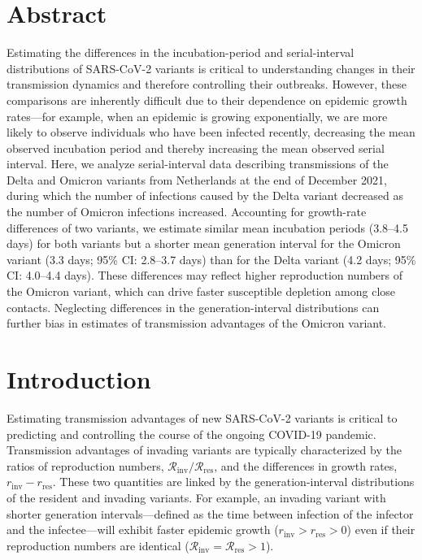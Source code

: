 \documentclass[12pt]{article}
\date{\today}
\newcommand{\Rx}[1]{\ensuremath{{\mathcal R}_{#1}}\xspace}
\newcommand{\Rres}{\Rx{\mathrm{res}}}
\newcommand{\Rinv}{\Rx{\mathrm{inv}}}
\newcommand{\rx}[1]{\ensuremath{{r}_{#1}}\xspace}
\newcommand{\rres}{\rx{\mathrm{res}}}
\newcommand{\rinv}{\rx{\mathrm{inv}}}
\begin{document}
\begin{flushleft}{
	\Large
	\textbf{}
}
\bigskip

\section*{Abstract}

Estimating the differences in the incubation-period and serial-interval distributions of SARS-CoV-2 variants is critical to understanding changes in their transmission dynamics and therefore controlling their outbreaks.
However, these comparisons are inherently difficult due to their dependence on epidemic growth rates---for example, when an epidemic is growing exponentially, we are more likely to observe individuals who have been infected recently, decreasing the mean observed incubation period and thereby increasing the mean observed serial interval.
Here, we analyze serial-interval data describing transmissions of the Delta and Omicron variants from Netherlands at the end of December 2021, during which the number of infections caused by the Delta variant decreased as the number of Omicron infections increased. 
Accounting for growth-rate differences of two variants, we estimate similar mean incubation periods (3.8--4.5 days) for both variants but a shorter mean generation interval for the Omicron variant (3.3 days; 95\% CI: 2.8--3.7 days) than for the Delta variant (4.2 days; 95\% CI: 4.0--4.4 days).
These differences may reflect higher reproduction numbers of the Omicron variant, which can drive faster susceptible depletion among close contacts.
Neglecting differences in the generation-interval distributions can further bias in estimates of transmission advantages of the Omicron variant.

\end{flushleft}

\pagebreak

\section{Introduction}

Estimating transmission advantages of new SARS-CoV-2 variants is critical to predicting and controlling the course of the ongoing COVID-19 pandemic.
Transmission advantages of invading variants are typically characterized by the ratios of reproduction numbers, $\Rinv/\Rres$, and the differences in growth rates, $\rinv-\rres$.
These two quantities are linked by the generation-interval distributions of the resident and invading variants.
For example, an invading variant with shorter generation intervals---defined as the time between infection of the infector and the infectee---will exhibit faster epidemic growth ($\rinv > \rres > 0$) even if their reproduction numbers are identical ($\Rinv = \Rres > 1$).
\end{document}
